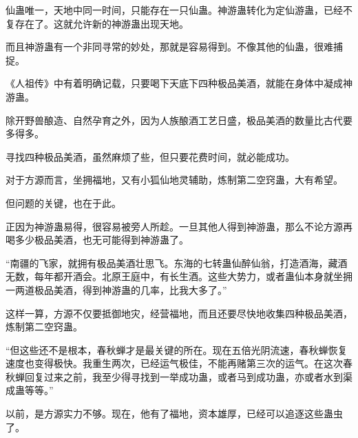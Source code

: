 \begin{this_body}
仙蛊唯一，天地中同一时间，只能存在一只仙蛊。神游蛊转化为定仙游蛊，已经不复存在了。这就允许新的神游蛊出现天地。

而且神游蛊有一个非同寻常的妙处，那就是容易得到。不像其他的仙蛊，很难捕捉。

《人祖传》中有着明确记载，只要喝下天底下四种极品美酒，就能在身体中凝成神游蛊。

除开野兽酿造、自然孕育之外，因为人族酿酒工艺日盛，极品美酒的数量比古代要多得多。

寻找四种极品美酒，虽然麻烦了些，但只要花费时间，就必能成功。

对于方源而言，坐拥福地，又有小狐仙地灵辅助，炼制第二空窍蛊，大有希望。

但问题的关键，也在于此。

正因为神游蛊易得，很容易被旁人所趁。一旦其他人得到神游蛊，那么不论方源再喝多少极品美酒，也无可能得到神游蛊了。

“南疆的飞家，就拥有极品美酒壮思飞。东海的七转蛊仙醉仙翁，打造酒海，藏酒无数，每年都开酒会。北原王庭中，有长生酒。这些大势力，或者蛊仙本身就坐拥一两道极品美酒，得到神游蛊的几率，比我大多了。”

这样一算，方源不仅要抵御地灾，经营福地，而且还要尽快地收集四种极品美酒，炼制第二空窍蛊。

“但这些还不是根本，春秋蝉才是最关键的所在。现在五倍光阴流速，春秋蝉恢复速度也变得极快。我重生两次，已经运气极佳，不能再赌第三次的运气。在这次春秋蝉回复过来之前，我至少得寻找到一举成功蛊，或者马到成功蛊，亦或者水到渠成蛊等等。”

以前，是方源实力不够。现在，他有了福地，资本雄厚，已经可以追逐这些蛊虫了。

\end{this_body}

